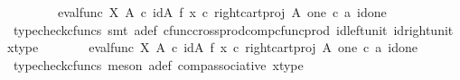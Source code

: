 \begin{isabellebody}
\ \ \ \ \ \ \ \ {\isacharparenleft}{\kern0pt}eval{\isacharunderscore}{\kern0pt}func\ X\ A{\isacharparenright}{\kern0pt}\ {\isasymcirc}\isactrlsub c\ {\isacharparenleft}{\kern0pt}{\isacharparenleft}{\kern0pt}id{\isacharparenleft}{\kern0pt}A{\isacharparenright}{\kern0pt}\ {\isasymtimes}\isactrlsub f\ {\isacharparenleft}{\kern0pt}x\ {\isasymcirc}\isactrlsub c\ right{\isacharunderscore}{\kern0pt}cart{\isacharunderscore}{\kern0pt}proj\ A\ one{\isacharparenright}{\kern0pt}\isactrlsup {\isasymsharp}{\isacharparenright}{\kern0pt}\ {\isasymcirc}\isactrlsub c\ {\isasymlangle}a{\isacharcomma}{\kern0pt}\ id{\isacharparenleft}{\kern0pt}one{\isacharparenright}{\kern0pt}{\isasymrangle}{\isacharparenright}{\kern0pt}{\isachardoublequoteclose}\isanewline
\ \ \ \ \isamarkupfalse%
\ {\isacharparenleft}{\kern0pt}typecheck{\isacharunderscore}{\kern0pt}cfuncs{\isacharcomma}{\kern0pt}\ smt\ a{\isacharunderscore}{\kern0pt}def\ cfunc{\isacharunderscore}{\kern0pt}cross{\isacharunderscore}{\kern0pt}prod{\isacharunderscore}{\kern0pt}comp{\isacharunderscore}{\kern0pt}cfunc{\isacharunderscore}{\kern0pt}prod\ id{\isacharunderscore}{\kern0pt}left{\isacharunderscore}{\kern0pt}unit{}\ id{\isacharunderscore}{\kern0pt}right{\isacharunderscore}{\kern0pt}unit{}\ x{\isacharunderscore}{\kern0pt}type{}{\isacharparenright}{\kern0pt}\isanewline
\ \ \isamarkupfalse%
\ \isamarkupfalse%
\ {\isachardoublequoteopen}{\isachardot}{\kern0pt}{\isachardot}{\kern0pt}{\isachardot}{\kern0pt}\ {\isacharequal}{\kern0pt}\ {\isacharparenleft}{\kern0pt}{\isacharparenleft}{\kern0pt}eval{\isacharunderscore}{\kern0pt}func\ X\ A{\isacharparenright}{\kern0pt}\ {\isasymcirc}\isactrlsub c\ {\isacharparenleft}{\kern0pt}id{\isacharparenleft}{\kern0pt}A{\isacharparenright}{\kern0pt}\ {\isasymtimes}\isactrlsub f\ {\isacharparenleft}{\kern0pt}x\ {\isasymcirc}\isactrlsub c\ right{\isacharunderscore}{\kern0pt}cart{\isacharunderscore}{\kern0pt}proj\ A\ one{\isacharparenright}{\kern0pt}\isactrlsup {\isasymsharp}{\isacharparenright}{\kern0pt}{\isacharparenright}{\kern0pt}\ {\isasymcirc}\isactrlsub c\ {\isasymlangle}a{\isacharcomma}{\kern0pt}\ id{\isacharparenleft}{\kern0pt}one{\isacharparenright}{\kern0pt}{\isasymrangle}{\isachardoublequoteclose}\isanewline
\ \ \ \ \isamarkupfalse%
\ {\isacharparenleft}{\kern0pt}typecheck{\isacharunderscore}{\kern0pt}cfuncs{\isacharcomma}{\kern0pt}\ meson\ a{\isacharunderscore}{\kern0pt}def\ comp{\isacharunderscore}{\kern0pt}associative{}\ x{\isacharunderscore}{\kern0pt}type{}{\isacharparenright}{\kern0pt}\isanewline

\end{isabellebody}
